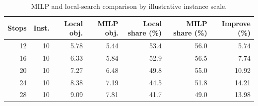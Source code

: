 \begin{table}[htbp]
\centering
\small
\caption{MILP and local-search comparison by illustrative instance scale.}
\label{tab:illustrative_milp_vs_local}
\begin{tabular}{rrrrrrr}
\toprule
Stops & Inst. & Local obj. & MILP obj. & Local share (\%) & MILP share (\%) & Improve (\%) \\
\midrule
12 & 10 & 5.78 & 5.44 & 53.4 & 56.0 & 5.74 \\
16 & 10 & 6.33 & 5.84 & 52.9 & 56.5 & 7.74 \\
20 & 10 & 7.27 & 6.48 & 49.8 & 55.0 & 10.92 \\
24 & 10 & 8.38 & 7.19 & 44.5 & 51.8 & 14.21 \\
28 & 10 & 9.09 & 7.81 & 41.7 & 49.0 & 13.98 \\
\bottomrule
\end{tabular}
\end{table}
